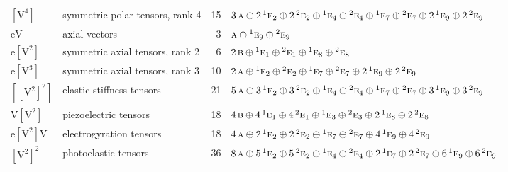 \documentclass[10pt,a4paper]{article}
\numberwithin{equation}{section}
\newcommand{\irr}[1]{\text{\normalfont\scshape #1}}
\newcommand{\conjpair}[1]{{}^{#1}}
\newcommand{\jahn}[1]{\mathrm{#1}}
\newlength{\fillwidth}\newlength{\cellwidth}\newlength{\colwidth}
\begin{document}
{\begin{longtable}{@{}llr>{\RaggedRight\arraybackslash}p{\fillwidth}@{}}
$\jahn{[V^{4}]}$ & symmetric polar tensors, rank 4 & 15 & $3\,\irr{a} \oplus\allowbreak 2\,\conjpair{1}\irr{e}_{2} \oplus\allowbreak 2\,\conjpair{2}\irr{e}_{2} \oplus\allowbreak \conjpair{1}\irr{e}_{4} \oplus\allowbreak \conjpair{2}\irr{e}_{4} \oplus\allowbreak \conjpair{1}\irr{e}_{7} \oplus\allowbreak \conjpair{2}\irr{e}_{7} \oplus\allowbreak 2\,\conjpair{1}\irr{e}_{9} \oplus\allowbreak 2\,\conjpair{2}\irr{e}_{9}$\\
$\jahn{eV}$ & axial vectors & 3 & $\irr{a} \oplus\allowbreak \conjpair{1}\irr{e}_{9} \oplus\allowbreak \conjpair{2}\irr{e}_{9}$\\
$\jahn{e[V^{2}]}$ & symmetric axial tensors, rank 2 & 6 & $2\,\irr{b} \oplus\allowbreak \conjpair{1}\irr{e}_{1} \oplus\allowbreak \conjpair{2}\irr{e}_{1} \oplus\allowbreak \conjpair{1}\irr{e}_{8} \oplus\allowbreak \conjpair{2}\irr{e}_{8}$\\
$\jahn{e[V^{3}]}$ & symmetric axial tensors, rank 3 & 10 & $2\,\irr{a} \oplus\allowbreak \conjpair{1}\irr{e}_{2} \oplus\allowbreak \conjpair{2}\irr{e}_{2} \oplus\allowbreak \conjpair{1}\irr{e}_{7} \oplus\allowbreak \conjpair{2}\irr{e}_{7} \oplus\allowbreak 2\,\conjpair{1}\irr{e}_{9} \oplus\allowbreak 2\,\conjpair{2}\irr{e}_{9}$\\
$\jahn{[[V^{2}]^{2}]}$ & elastic stiffness tensors & 21 & $5\,\irr{a} \oplus\allowbreak 3\,\conjpair{1}\irr{e}_{2} \oplus\allowbreak 3\,\conjpair{2}\irr{e}_{2} \oplus\allowbreak \conjpair{1}\irr{e}_{4} \oplus\allowbreak \conjpair{2}\irr{e}_{4} \oplus\allowbreak \conjpair{1}\irr{e}_{7} \oplus\allowbreak \conjpair{2}\irr{e}_{7} \oplus\allowbreak 3\,\conjpair{1}\irr{e}_{9} \oplus\allowbreak 3\,\conjpair{2}\irr{e}_{9}$\\
$\jahn{V[V^{2}]}$ & piezoelectric tensors & 18 & $4\,\irr{b} \oplus\allowbreak 4\,\conjpair{1}\irr{e}_{1} \oplus\allowbreak 4\,\conjpair{2}\irr{e}_{1} \oplus\allowbreak \conjpair{1}\irr{e}_{3} \oplus\allowbreak \conjpair{2}\irr{e}_{3} \oplus\allowbreak 2\,\conjpair{1}\irr{e}_{8} \oplus\allowbreak 2\,\conjpair{2}\irr{e}_{8}$\\
$\jahn{e[V^{2}]V}$ & electrogyration tensors & 18 & $4\,\irr{a} \oplus\allowbreak 2\,\conjpair{1}\irr{e}_{2} \oplus\allowbreak 2\,\conjpair{2}\irr{e}_{2} \oplus\allowbreak \conjpair{1}\irr{e}_{7} \oplus\allowbreak \conjpair{2}\irr{e}_{7} \oplus\allowbreak 4\,\conjpair{1}\irr{e}_{9} \oplus\allowbreak 4\,\conjpair{2}\irr{e}_{9}$\\
$\jahn{[V^{2}]^{2}}$ & photoelastic tensors & 36 & $8\,\irr{a} \oplus\allowbreak 5\,\conjpair{1}\irr{e}_{2} \oplus\allowbreak 5\,\conjpair{2}\irr{e}_{2} \oplus\allowbreak \conjpair{1}\irr{e}_{4} \oplus\allowbreak \conjpair{2}\irr{e}_{4} \oplus\allowbreak 2\,\conjpair{1}\irr{e}_{7} \oplus\allowbreak 2\,\conjpair{2}\irr{e}_{7} \oplus\allowbreak 6\,\conjpair{1}\irr{e}_{9} \oplus\allowbreak 6\,\conjpair{2}\irr{e}_{9}$\\

\end{longtable}}
\end{document}
